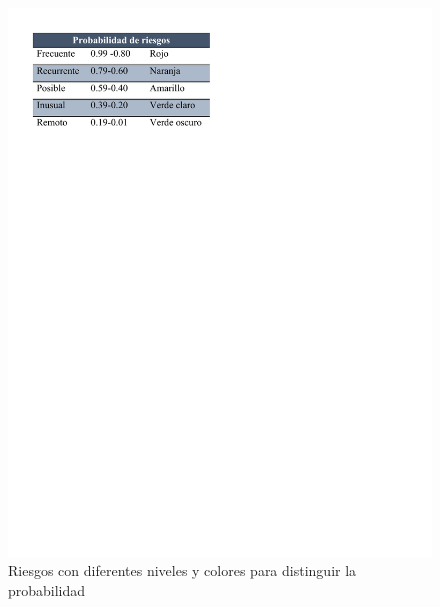     \begin{figure}[H] 
        \centering
        \includegraphics[trim = {10mm 215mm 100mm 10mm},clip,scale=0.7]{22/Img/riesgosPorProbabilidad.pdf}
        \caption{Riesgos con diferentes niveles y colores para distinguir la probabilidad}
        \label{fig:prob}
    \end{figure}
    
